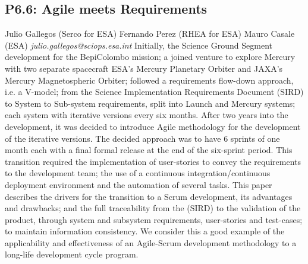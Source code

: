 \documentclass{report}
\begin{document}
\subsection*{P6.6: Agile meets Requirements}
\bigskip
Julio Gallegos (Serco for ESA) \newline Fernando Perez (RHEA for ESA) \newline  Mauro Casale (ESA)\newline   \newline  \newline  \newline\newline
{\it julio.gallegos@sciops.esa.int}\newline
\newline\newline
Initially, the Science Ground Segment development for the BepiColombo mission; a joined venture to explore Mercury with two separate spacecraft ESA’s Mercury Planetary Orbiter and JAXA’s Mercury Magnetospheric Orbiter; followed a requirements flow-down approach, i.e. a V-model; from the Science Implementation Requirements Document (SIRD) to System to Sub-system requirements, split into Launch and Mercury systems; each system with iterative versions every six months. After two years into the development, it was decided to introduce Agile methodology for the development of the iterative versions.  The decided approach was to have 6 sprints of one month each with a final formal release at the end of the six-sprint period.  This transition required the implementation of user-stories to convey the requirements to the development team; the use of a continuous integration/continuous deployment environment and the automation of several tasks.
This paper describes the drivers for the transition to a Scrum development, its advantages and drawbacks; and the full traceability from the (SIRD) to the validation of the product, through system and subsystem requirements, user-stories and test-cases; to maintain information consistency. We consider this a good example of the applicability and effectiveness of an Agile-Scrum development methodology to a long-life development cycle program.\newline
\newpage
\end{document}
